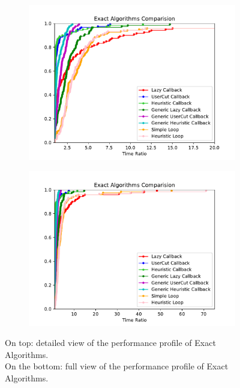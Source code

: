 \begin{figure}[h!]
  \centering
  \begin{subfigure}[b]{0.97\linewidth}
    \includegraphics[width=\linewidth]{media/Exact.pdf}
  \end{subfigure}
  \begin{subfigure}[b]{0.97\linewidth}
  \ContinuedFloat
    \includegraphics[width=\linewidth]{media/Exact1.pdf}
  \end{subfigure}
  \caption{On top: detailed view of the performance profile of Exact Algorithms. \\On the bottom: full view of the performance profile of Exact Algorithms.}
      \label{fig:exact}
\end{figure}

